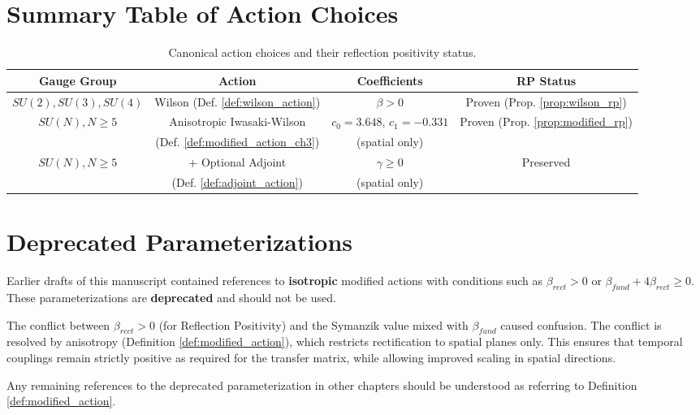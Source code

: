 \section{Summary Table of Action Choices}
\label{sec:action_summary}

\begin{table}[h]
\centering
\footnotesize
\setlength{\tabcolsep}{3pt}
\begin{tabular}{|c|c|c|c|}
\hline
\textbf{Gauge Group} & \textbf{Action} & \textbf{Coefficients} & \textbf{RP Status} \\
\hline
$SU(2), SU(3), SU(4)$ & Wilson (Def. \ref{def:wilson_action}) & $\beta > 0$ & Proven (Prop. \ref{prop:wilson_rp}) \\
\hline
$SU(N), N \geq 5$ & Anisotropic Iwasaki-Wilson & $c_0=3.648$, $c_1=-0.331$ & Proven (Prop. \ref{prop:modified_rp}) \\
 & (Def. \ref{def:modified_action_ch3}) & (spatial only) & \\
\hline
$SU(N), N \geq 5$ & + Optional Adjoint & $\gamma \geq 0$ & Preserved \\
 & (Def. \ref{def:adjoint_action}) & (spatial only) & \\
\hline
\end{tabular}
\caption{Canonical action choices and their reflection positivity status.}
\label{tab:action_summary}
\end{table}

\section{Deprecated Parameterizations}
\label{sec:deprecated}

\begin{remark}
Earlier drafts of this manuscript contained references to \textbf{isotropic} modified actions with conditions such as $\beta_{rect} > 0$ or $\beta_{fund} + 4\beta_{rect} \geq 0$. These parameterizations are \textbf{deprecated} and should not be used.

The conflict between $\beta_{rect} > 0$ (for Reflection Positivity) and the Symanzik value mixed with $\beta_{fund}$ caused confusion. The conflict is resolved by anisotropy (Definition \ref{def:modified_action}), which restricts rectification to spatial planes only. This ensures that temporal couplings remain strictly positive as required for the transfer matrix, while allowing improved scaling in spatial directions.

Any remaining references to the deprecated parameterization in other chapters should be understood as referring to Definition \ref{def:modified_action}.
\end{remark}

